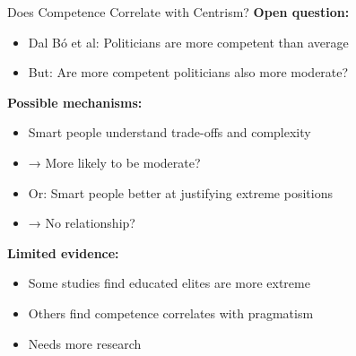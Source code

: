 \documentclass[10pt]{beamer}
\begin{document}
\begin{frame}{Does Competence Correlate with Centrism?}
\textbf{Open question:}


\begin{itemize}
\item Dal Bó et al: Politicians are more competent than average
\item \alert{But:} Are more competent politicians also more moderate?
\end{itemize}



\textbf{Possible mechanisms:}
\begin{itemize}
\item Smart people understand trade-offs and complexity
\item → More likely to be moderate?
\item Or: Smart people better at justifying extreme positions
\item → No relationship?
\end{itemize}



\textbf{Limited evidence:}
\begin{itemize}
\item Some studies find educated elites are more extreme
\item Others find competence correlates with pragmatism
\item \alert{Needs more research}
\end{itemize}
\end{frame}
\end{document}
